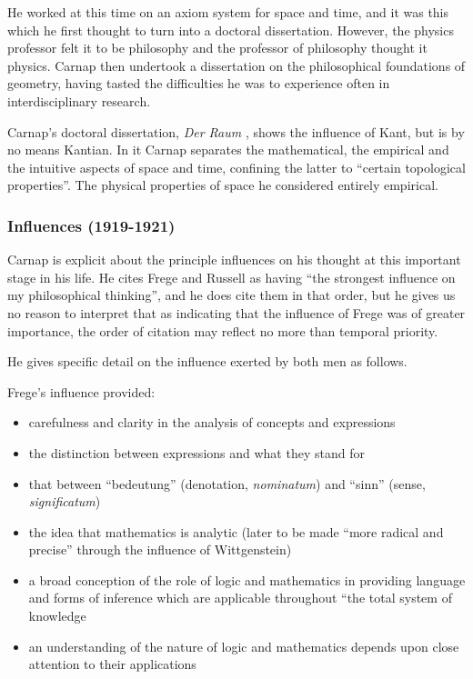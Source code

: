\documentclass[10pt,titlepage]{book}
\begin{document}
He worked at this time on an axiom system for space and time, and it was this which he first thought to turn into a doctoral dissertation.
However, the physics professor felt it to be philosophy and the professor of philosophy thought it physics.
Carnap then undertook a dissertation on the philosophical foundations of geometry, having tasted the difficulties he was to experience often in interdisciplinary research.

Carnap's doctoral dissertation, \emph{Der Raum} \cite{carnap21}, shows the influence of Kant, but is by no means Kantian.
In it Carnap separates the mathematical, the empirical and the intuitive aspects of space and time, confining the latter to ``certain topological properties''.
The physical properties of space he considered entirely empirical.

\subsubsection{Influences (1919-1921)}

Carnap is explicit about the principle influences on his thought at this important stage in his life.
He cites Frege and Russell as having ``the strongest influence on my philosophical thinking'', and he does cite them in that order, but he gives us no reason to interpret that as indicating that the influence of Frege was of greater importance, the order of citation may reflect no more than temporal priority.

He gives specific detail on the influence exerted by both men as follows.

Frege's influence provided:
\begin{itemize}
\item carefulness and clarity in the analysis of concepts and expressions
\item the distinction between expressions and what they stand for
\item that between ``bedeutung'' (denotation, \emph{nominatum}) and ``sinn'' (sense, \emph{significatum})
\item the idea that mathematics is analytic (later to be made ``more radical and precise'' through the influence of Wittgenstein)
\item a broad conception of the role of logic and mathematics in providing language and forms of inference which are applicable throughout ``the total system of knowledge
\item an understanding of the nature of logic and mathematics depends upon close attention to their applications
\end{itemize}
\end{document}
